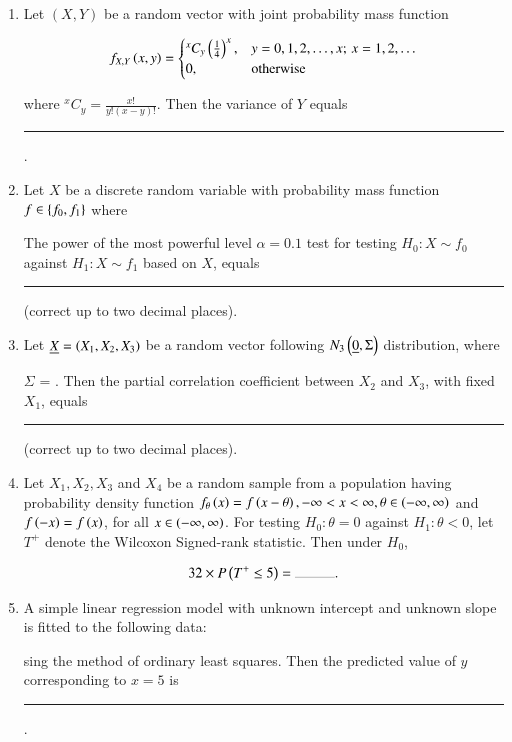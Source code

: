 \documentclass[journal,12pt,onecolumn]{IEEEtran}
\theoremstyle{remark}
\begin{document}
\begin{enumerate}
\item Let $ (X, Y) $ be a random vector with joint probability mass function

\begin{align*}
f_{X,Y}\left(x,y\right) = 
\begin{cases} 
{}^x C_y \left( \frac{1}{4} \right)^x, & y = 0, 1, 2, \ldots, x; \, x = 1, 2, \ldots \\
0, & \text{otherwise}
\end{cases}
\end{align*}

where $ {}^x C_y = \frac{x!}{y!(x - y)!} $. Then the variance of $ Y $ equals \rule{1cm}{0.2pt}.

\item Let $X$ be a discrete random variable with probability mass function $f \in \left\{f_0, f_1\right\}$ where
	\begin{table}[ht]
		\centering
		
	\end{table}
      The power of the most powerful level $\alpha = 0.1$ test for testing $
	H_0 : X \sim f_0$ against $H_1 : X \sim f_1$ based on $X$, equals \rule{1cm}{0.2pt} (correct up to two decimal places).

\item Let $ \underline{X} = \left(X_1, X_2, X_3\right) $ be a random vector following $ N_{3}\left(\underline{0}, \Sigma\right) $ distribution, where


$\Sigma$ = . Then the partial correlation coefficient between $ X_2 $ and $ X_3 $, with fixed $ X_1 $, equals \rule{1cm}{0.2pt} (correct up to two decimal places).

\item Let $ X_1, X_2, X_3 $ and $ X_4 $ be a random sample from a population having probability density function $ f_\theta\left(x\right) = f\left(x - \theta\right), -\infty < x < \infty, \theta \in \left(-\infty, \infty\right) $ and $ f\left(-x\right) = f\left(x\right) $, for all $ x \in \left(-\infty, \infty\right) $. For testing $ H_0 : \theta = 0 $ against $ H_1 : \theta < 0 $, let $ T^+ $ denote the Wilcoxon Signed-rank statistic. Then under $ H_0 $,

	\begin{align*}
		32 \times P\brak{T^+ \leq 5} = \rule{1cm}{0.2pt}.
	\end{align*}

\item A simple linear regression model with unknown intercept and unknown slope is fitted to the following data:
	\begin{table}[ht]
		\centering
		
	\end{table}
sing the method of ordinary least squares. Then the predicted value of $y$ corresponding to $x=5$ is \rule{1cm}{0.2pt}.


\end{enumerate}
\end{document}
